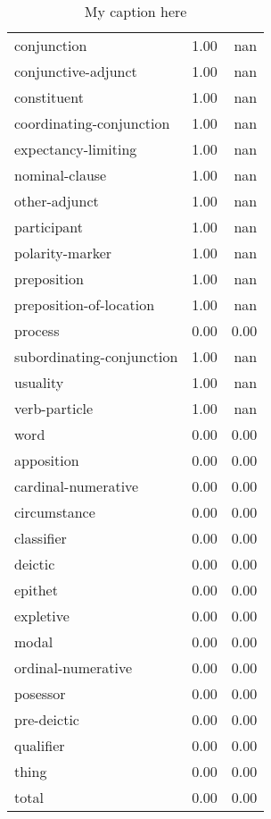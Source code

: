 \begin{table}[!ht]
\begin{tabular}{lrr}
conjunction               &       1.00 &                  nan \\
conjunctive-adjunct       &       1.00 &                  nan \\
constituent               &       1.00 &                  nan \\
coordinating-conjunction  &       1.00 &                  nan \\
expectancy-limiting       &       1.00 &                  nan \\
nominal-clause            &       1.00 &                  nan \\
other-adjunct             &       1.00 &                  nan \\
participant               &       1.00 &                  nan \\
polarity-marker           &       1.00 &                  nan \\
preposition               &       1.00 &                  nan \\
preposition-of-location   &       1.00 &                  nan \\
process                   &       0.00 &                 0.00 \\
subordinating-conjunction &       1.00 &                  nan \\
usuality                  &       1.00 &                  nan \\
verb-particle             &       1.00 &                  nan \\
word                      &       0.00 &                 0.00 \\
apposition                &       0.00 &                 0.00 \\
cardinal-numerative       &       0.00 &                 0.00 \\
circumstance              &       0.00 &                 0.00 \\
classifier                &       0.00 &                 0.00 \\
deictic                   &       0.00 &                 0.00 \\
epithet                   &       0.00 &                 0.00 \\
expletive                 &       0.00 &                 0.00 \\
modal                     &       0.00 &                 0.00 \\
ordinal-numerative        &       0.00 &                 0.00 \\
posessor                  &       0.00 &                 0.00 \\
pre-deictic               &       0.00 &                 0.00 \\
qualifier                 &       0.00 &                 0.00 \\
thing                     &       0.00 &                 0.00 \\
total                     &       0.00 &                 0.00 \\
\bottomrule
\end{tabular}
\caption{My caption here}
\label{tab:constituency-general-combined-errors}
\end{table}